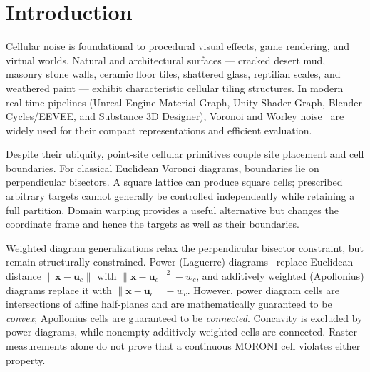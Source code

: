 \documentclass[sigconf,nonacm]{acmart}
\begin{document}
\section{Introduction}

Cellular noise is foundational to procedural visual effects, game rendering,
and virtual worlds. Natural and architectural surfaces --- cracked desert mud,
masonry stone walls, ceramic floor tiles, shattered glass, reptilian scales, and
weathered paint --- exhibit characteristic cellular tiling structures. In modern
real-time pipelines (Unreal Engine Material Graph, Unity Shader Graph, Blender
Cycles/EEVEE, and Substance 3D Designer), Voronoi and Worley
noise~\cite{voronoi1908,worley1996} are widely used for their compact
representations and efficient evaluation.

Despite their ubiquity, point-site cellular primitives couple site placement and cell boundaries.
For classical Euclidean Voronoi diagrams, boundaries lie on perpendicular
bisectors. A square lattice can produce square cells; prescribed arbitrary
targets cannot generally be controlled independently while retaining a full
partition. Domain warping provides a useful alternative but changes the
coordinate frame and hence the targets as well as their boundaries.

Weighted diagram generalizations relax the perpendicular bisector constraint,
but remain structurally constrained. Power (Laguerre)
diagrams~\cite{aurenhammer1987power} replace Euclidean distance
$\lVert\mathbf{x}-\mathbf{u}_c\rVert$ with $\lVert\mathbf{x}-\mathbf{u}_c\rVert^2 - w_c$,
and additively weighted (Apollonius) diagrams replace it with
$\lVert\mathbf{x}-\mathbf{u}_c\rVert - w_c$. However, power diagram cells are
intersections of affine half-planes and are mathematically guaranteed to be
\emph{convex}; Apollonius cells are guaranteed to be \emph{connected}. Concavity is excluded by power diagrams, while nonempty additively weighted
cells are connected. Raster measurements alone do not prove that a continuous
MORONI cell violates either property.
\end{document}
